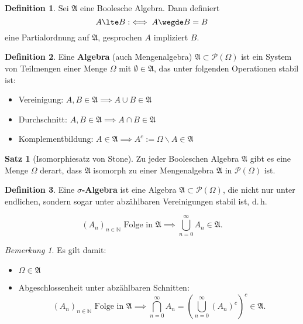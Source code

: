 \documentclass[a4paper,10pt,landscape]{article}
\newcommand{\N}{\mathbb{N}}
\theoremstyle{definition}
\newtheorem*{defn}{Definition}
\newtheorem*{satz}{Satz}
\theoremstyle{remark}
\newtheorem*{bem}{Bemerkung}
\renewcommand{\emph}[1]{\textcolor{Emph}{\bf{#1}}}
\begin{document}
\begin{multicols}{3}
\begin{defn}
  Sei $\mathfrak{A}$ eine Boolesche Algebra. Dann definiert
  \[ A \lte B :\iff A \wegde B = B \]
  eine Partialordnung auf $\mathfrak{A}$, gesprochen $A$ impliziert $B$.
\end{defn}

\begin{defn}
  Eine \emph{Algebra} (auch Mengenalgebra) $\mathfrak{A} \subset \mathcal{P}(\Omega)$ ist ein System von Teilmengen einer Menge $\Omega$ mit $\emptyset \in \mathfrak{A}$, das unter folgenden Operationen stabil ist:
  \begin{itemize}
    \item Vereinigung: $A, B \in \mathfrak{A} \implies A \cup B \in \mathfrak{A}$
    \item Durchschnitt: $A, B \in \mathfrak{A} \implies A \cap B \in \mathfrak{A}$
    \item Komplementbildung: $A \in \mathfrak{A} \implies A^c := \Omega \backslash A \in \mathfrak{A}$
  \end{itemize}
\end{defn}

\begin{satz}[Isomorphiesatz von Stone]
Zu jeder Booleschen Algebra $\mathfrak{A}$ gibt es eine Menge $\Omega$ derart, dass $\mathfrak{A}$ isomorph zu einer Mengenalgebra $\mathfrak{A}$ in $\mathcal{P}(\Omega)$ ist.
\end{satz}

\begin{defn}
  Eine \emph{$\sigma$-Algebra} ist eine Algebra $\mathfrak{A} \subset \mathcal{P}(\Omega)$, die nicht nur unter endlichen, sondern sogar unter abzählbaren Vereinigungen stabil ist, d.\,h.

  \[ (A_n)_{n \in \N} \text{ Folge in } \mathfrak{A} \implies \bigcup_{n = 0}^{\infty} A_n \in \mathfrak{A}. \]
\end{defn}

\begin{bem}
  Es gilt damit:

  \begin{itemize}
    \item $\Omega \in \mathfrak{A}$
    \item Abgeschlossenheit unter abzählbaren Schnitten:
  \[ (A_n)_{n \in \N} \text{ Folge in } \mathfrak{A} \implies \bigcap_{n = 0}^{\infty} A_n = \left( \bigcup_{n = 0}^{\infty} (A_n)^c \right)^c \in \mathfrak{A}. \]
  \end{itemize}
\end{bem}


\end{multicols}
\end{document}
